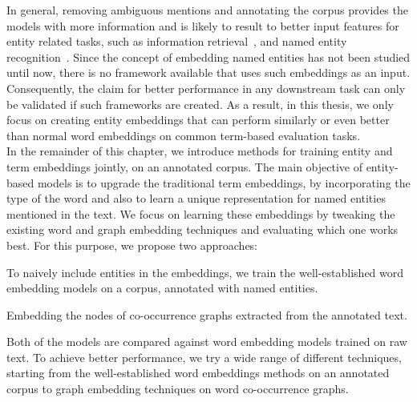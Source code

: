 In general, removing ambiguous mentions and annotating the corpus provides the models with more information and is likely to result to better input features for entity related tasks, such as information retrieval~, and named entity recognition~.
Since the concept of embedding named entities has not been studied until now, there is no framework available that uses such embeddings as an input. Consequently, the claim for better performance in any downstream task can only be validated if such frameworks are created. As a result, in this thesis, we only focus on creating entity embeddings that can perform similarly or even better than normal word embeddings on common term-based evaluation tasks.\\
In the remainder of this chapter, we introduce methods for training entity and term embeddings jointly, on an annotated corpus. The main objective of entity-based models is to upgrade the traditional term embeddings, by incorporating the type of the word and also to learn a unique representation for named entities mentioned in the text. We focus on learning these embeddings by tweaking the existing word and graph embedding techniques and evaluating which one works best. For this purpose, we propose two approaches: 
\begin{compactenum}
\item To naively include entities in the embeddings, we train the well-established word embedding models on a corpus, annotated with named entities. 
\item Embedding the nodes of co-occurrence graphs extracted from the annotated text. 
\end{compactenum}
Both of the models are compared against word embedding models trained on raw text. To achieve better performance, we try a wide range of different techniques, starting from the well-established word embeddings methods on an annotated corpus to graph embedding techniques on word co-occurrence graphs. 

